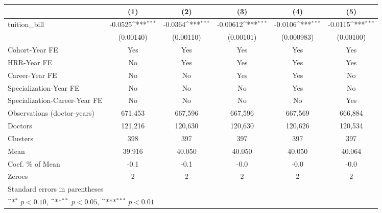 {
\def\sym#1{\ifmmode^{#1}\else\(^{#1}\)\fi}
\begin{tabular}{l*{5}{c}}
\hline\hline
                    &\multicolumn{1}{c}{(1)}         &\multicolumn{1}{c}{(2)}         &\multicolumn{1}{c}{(3)}         &\multicolumn{1}{c}{(4)}         &\multicolumn{1}{c}{(5)}         \\
\hline
tuition\_bill        &     -0.0525\sym{***}&     -0.0364\sym{***}&    -0.00612\sym{***}&     -0.0106\sym{***}&     -0.0115\sym{***}\\
                    &   (0.00140)         &   (0.00110)         &   (0.00101)         &  (0.000983)         &   (0.00100)         \\
[1em]
Cohort-Year FE      &         Yes         &         Yes         &         Yes         &         Yes         &         Yes         \\
[1em]
HRR-Year FE         &          No         &         Yes         &         Yes         &         Yes         &         Yes         \\
[1em]
Career-Year FE      &          No         &          No         &         Yes         &         Yes         &          No         \\
[1em]
Specialization-Year FE&          No         &          No         &          No         &         Yes         &          No         \\
[1em]
Specialization-Career-Year FE&          No         &          No         &          No         &          No         &         Yes         \\
\hline
Observations (doctor-years)&     671,453         &     667,596         &     667,596         &     667,569         &     666,884         \\
Doctors             &     121,216         &     120,630         &     120,630         &     120,626         &     120,534         \\
Clusters            &         398         &         397         &         397         &         397         &         397         \\
Mean                &      39.916         &      40.050         &      40.050         &      40.050         &      40.064         \\
Coef. \% of Mean    &        -0.1         &        -0.1         &        -0.0         &        -0.0         &        -0.0         \\
Zeroes              &           2         &           2         &           2         &           2         &           2         \\
\hline\hline
\multicolumn{6}{l}{\footnotesize Standard errors in parentheses}\\
\multicolumn{6}{l}{\footnotesize \sym{*} \(p<0.10\), \sym{**} \(p<0.05\), \sym{***} \(p<0.01\)}\\
\end{tabular}
}
